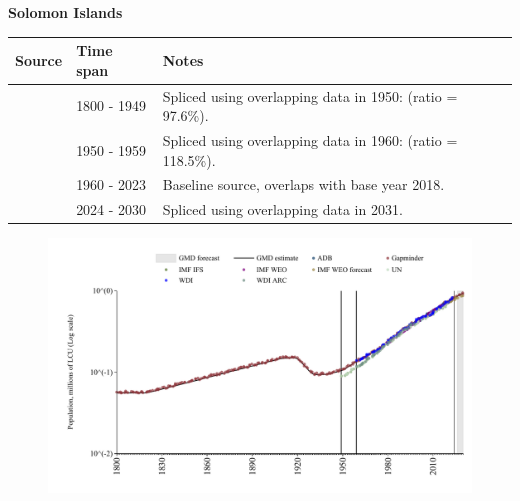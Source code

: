 \documentclass[12pt,a4paper,landscape]{article}
\begin{document}
\begin{adjustbox}{max totalsize={\paperwidth}{\paperheight},center}
\begin{minipage}[t][\textheight][t]{\textwidth}
\vspace*{0.5cm}
{}
\begin{center}
{\Large\bfseries Solomon Islands}
\end{center}
\vspace{0.5cm}
\begin{table}[H]
\centering
\small
\begin{tabular}{|l|l|l|}
\hline
\textbf{Source} & \textbf{Time span} & \textbf{Notes} \\
\hline
\rowcolor{white}\cite{Gapminder}& 1800 - 1949 &Spliced using overlapping data in 1950: (ratio = 97.6\%).\\
\rowcolor{lightgray}\cite{IMF_IFS}& 1950 - 1959 &Spliced using overlapping data in 1960: (ratio = 118.5\%).\\
\rowcolor{white}\cite{WDI}& 1960 - 2023 &Baseline source, overlaps with base year 2018.\\
\rowcolor{lightgray}\cite{Gapminder}& 2024 - 2030 &Spliced using overlapping data in 2031.\\
\hline
\end{tabular}
\end{table}
\begin{figure}[H]
\centering
\includegraphics[width=\textwidth,height=0.6\textheight,keepaspectratio]{graphs/SLB_pop.pdf}
\end{figure}
\end{minipage}
\end{adjustbox}
\end{document}
